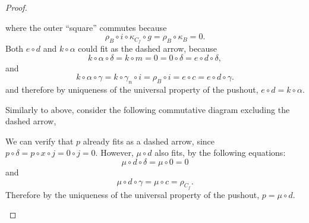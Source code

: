 \begin{proof}
\begin{enumerate}[label={(\bfseries TR\arabic*)}]
{\begin{center}
            \end{center}
            where the outer ``square'' commutes because
            \[
                \rho_B \circ i \circ \kappa_{C_f} \circ g = \rho_B \circ \kappa_B = 0.
            \]
            Both \( e \circ d \) and \( k \circ \alpha \) could fit as the dashed arrow, because
            \[
                k \circ \alpha \circ \delta = k \circ m = 0 = 0 \circ \delta = e \circ d \circ \delta,
            \]
            and
            \[
                k \circ \alpha \circ \gamma = k \circ \gamma_n \circ i = \rho_B \circ i = e \circ c = e \circ d \circ \gamma.
            \]
            and therefore by uniqueness of the universal property of the pushout, \( e \circ d = k \circ \alpha \).

            Similarly to above, consider the following commutative diagram excluding the dashed arrow,
            \begin{center}
            \end{center}

            We can verify that \( p \) already fits as a dashed arrow, since \( p \circ \delta = p \circ x \circ j = 0 \circ j = 0 \). However, \( \mu \circ d \) also fits, by the following equations:
            \[
                \mu \circ d \circ \delta = \mu \circ 0 = 0
            \]
            and
            \[
               \mu \circ d \circ \gamma = \mu \circ c = \rho_{C_f}.
            \]
            Therefore by the uniqueness of the universal property of the pushout, \( p = \mu \circ d \).

}
\end{enumerate}
\end{proof}
